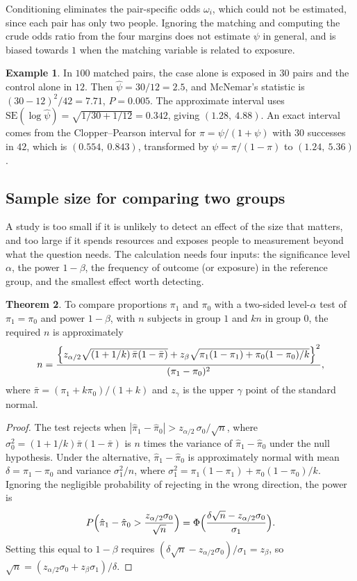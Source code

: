 \documentclass[11pt,a4paper]{article}
\numberwithin{equation}{section}
\theoremstyle{definition}
\newtheorem{thm}{Theorem}[subsection]
\newtheorem{exa}[thm]{Example}
\begin{document}
Conditioning eliminates the pair-specific odds $\omega_i$, which could not be estimated, since each pair has only two people. Ignoring the
matching and computing the crude odds ratio from the four margins does not estimate $\psi$ in general, and is biased towards $1$ when the
matching variable is related to exposure.

\begin{exa}
\label{exa:pairs}
In $100$ matched pairs, the case alone is exposed in $30$ pairs and the control alone in $12$. Then $\hat\psi = 30/12 = 2.5$, and McNemar's
statistic is $(30 - 12)^2/42 = 7.71$, $P = 0.005$. The approximate interval uses $\text{SE}(\log\hat\psi) = \sqrt{1/30 + 1/12} = 0.342$, giving
$(1.28,\ 4.88)$. An exact interval comes from the Clopper--Pearson interval for $\pi = \psi/(1 + \psi)$ with $30$ successes in $42$, which is
$(0.554,\ 0.843)$, transformed by $\psi = \pi/(1 - \pi)$ to $(1.24,\ 5.36)$.
\end{exa}

\subsection{Sample size for comparing two groups}
\label{sec:samplesize}

A study is too small if it is unlikely to detect an effect of the size that matters, and too large if it spends resources and exposes
people to measurement beyond what the question needs. The calculation needs four inputs: the significance level $\alpha$, the power
$1 - \beta$, the frequency of outcome (or exposure) in the reference group, and the smallest effect worth detecting.

\begin{thm}
\label{thm:ss}
To compare proportions $\pi_1$ and $\pi_0$ with a two-sided level-$\alpha$ test of $\pi_1 = \pi_0$ and power $1 - \beta$, with $n$ subjects in group $1$ and $kn$ in
group $0$, the required $n$ is approximately
\[
n = \frac{\Bigl\{z_{\alpha/2}\sqrt{(1 + 1/k)\,\bar\pi(1 - \bar\pi)} + z_\beta\sqrt{\pi_1(1 - \pi_1) + \pi_0(1 - \pi_0)/k}\Bigr\}^2}{(\pi_1 - \pi_0)^2} ,
\]
where $\bar\pi = (\pi_1 + k\pi_0)/(1 + k)$ and $z_\gamma$ is the upper $\gamma$ point of the standard normal.
\end{thm}

\begin{proof}
The test rejects when $|\hat\pi_1 - \hat\pi_0| > z_{\alpha/2}\,\sigma_0/\sqrt n$, where $\sigma_0^2 = (1 + 1/k)\bar\pi(1 - \bar\pi)$ is $n$ times the variance of $\hat\pi_1 - \hat\pi_0$ under the null
hypothesis. Under the alternative, $\hat\pi_1 - \hat\pi_0$ is approximately normal with mean $\delta = \pi_1 - \pi_0$ and variance $\sigma_1^2/n$, where
$\sigma_1^2 = \pi_1(1 - \pi_1) + \pi_0(1 - \pi_0)/k$. Ignoring the negligible probability of rejecting in the wrong direction, the power is
\[
P\Bigl(\hat\pi_1 - \hat\pi_0 > \frac{z_{\alpha/2}\sigma_0}{\sqrt n}\Bigr) = \Phi\Bigl(\frac{\delta\sqrt n - z_{\alpha/2}\sigma_0}{\sigma_1}\Bigr) .
\]
Setting this equal to $1 - \beta$ requires $(\delta\sqrt n - z_{\alpha/2}\sigma_0)/\sigma_1 = z_\beta$, so $\sqrt n = (z_{\alpha/2}\sigma_0 + z_\beta\sigma_1)/\delta$.
\end{proof}
\end{document}
